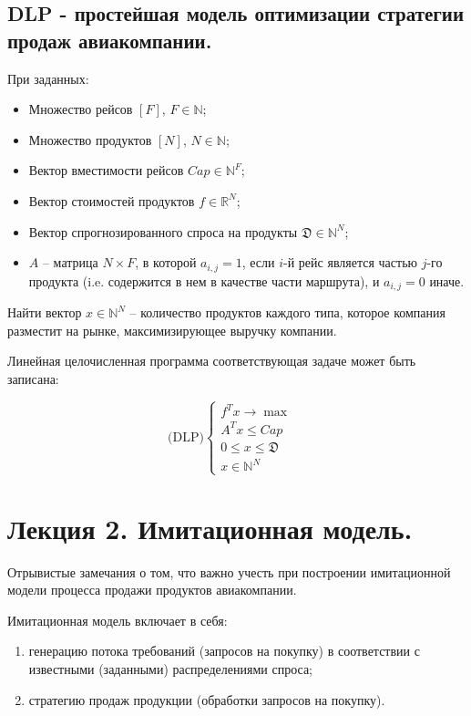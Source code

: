 \documentclass[12pt, reqno]{article}
\theoremstyle{definition}
\theoremstyle{definition}
\theoremstyle{definition}
\theoremstyle{definition}
\theoremstyle{definition}
\theoremstyle{definition}
\theoremstyle{definition}
\theoremstyle{definition}
\theoremstyle{definition}
\begin{document}
		\subsection{DLP - простейшая модель оптимизации стратегии продаж авиакомпании.}
		
		При заданных:
		\begin{itemize}
			\item Множество рейсов $[F]$, $F \in \mathds{N}$;
			\item Множество продуктов $[N]$, $N \in \mathds{N}$;
			\item Вектор вместимости рейсов $Cap \in \mathds{N}^F$;
			\item Вектор стоимостей продуктов $f \in \mathds{R}^N$;
			\item Вектор спрогнозированного спроса на продукты $\mathfrak{D} \in \mathds{N}^N$;
			\item $A$ -- матрица $N\times F$, в которой $a_{i, j} = 1$, если $i$-й рейс является частью $j$-го продукта (i.e. содержится в нем в качестве части маршрута), и $a_{i, j} = 0$ иначе.
		\end{itemize}
		
		Найти вектор $x \in \mathds{N}^N$ -- количество продуктов каждого типа, которое компания разместит на рынке, максимизирующее выручку компании.
		
		Линейная целочисленная программа соответствующая задаче может быть записана:
	
		$$
		\text{(DLP)}
		\begin{cases}
			f^Tx \rightarrow \max & \\
			A^Tx \leq Cap & \\
			0 \leq x \leq \mathfrak{D} & \\
			x \in \mathds{N}^N &
		\end{cases}	
		$$
	
	
	
	\newpage
	\section{Лекция 2. Имитационная модель.}
	
		Отрывистые замечания о том, что важно учесть при построении имитационной модели процесса продажи продуктов авиакомпании.
		
		Имитационная модель включает в себя:
		\begin{enumerate}
			\item генерацию потока требований (запросов на покупку) в соответствии с известными (заданными) распределениями спроса;
			\item стратегию продаж продукции (обработки запросов на покупку).
		\end{enumerate}
		
\end{document}

